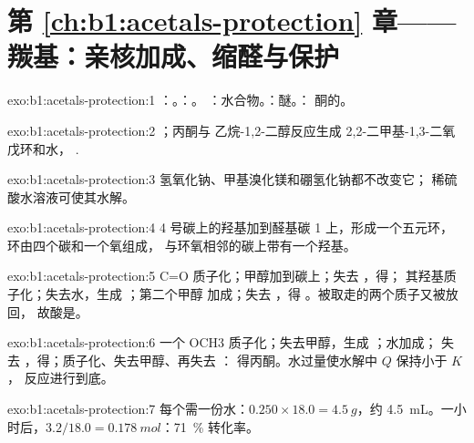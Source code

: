 \section*{第 \ref{ch:b1:acetals-protection} 章——羰基：亲核加成、缩醛与保护}

\begin{solution}{exo:b1:acetals-protection:1}
：。：。
：水合物。：醚。：
酮的。
\end{solution}

\begin{solution}{exo:b1:acetals-protection:2}
；丙酮与
乙烷-1,2-二醇反应生成 2,2-二甲基-1,3-二氧戊环和水，
.
\end{solution}

\begin{solution}{exo:b1:acetals-protection:3}
氢氧化钠、甲基溴化镁和硼氢化钠都不改变它；
稀硫酸水溶液可使其水解。
\end{solution}

\begin{solution}{exo:b1:acetals-protection:4}
4 号碳上的羟基加到醛基碳 1 上，形成一个五元环，
环由四个碳和一个氧组成，
与环氧相邻的碳上带有一个羟基。
\end{solution}

\begin{solution}{exo:b1:acetals-protection:5}
C=O 质子化；甲醇加到碳上；失去 ，得；
其羟基质子化；失去水，生成 ；第二个甲醇
加成；失去 ，得 。被取走的两个质子又被放回，
故酸是。
\end{solution}

\begin{solution}{exo:b1:acetals-protection:6}
一个 OCH3 质子化；失去甲醇，生成 ；水加成；
失去 ，得；质子化、失去甲醇、再失去 ：
得丙酮。水过量使水解中 $Q$ 保持小于 $K$，
反应进行到底。
\end{solution}

\begin{solution}{exo:b1:acetals-protection:7}
每个需一份水：$0.250 \times 18.0 = \qty{4.5}{g}$，约
\qty{4.5}{mL}。一小时后，$3.2/18.0 = \qty{0.178}{mol}$：\qty{71}{\percent}
转化率。
\end{solution}

